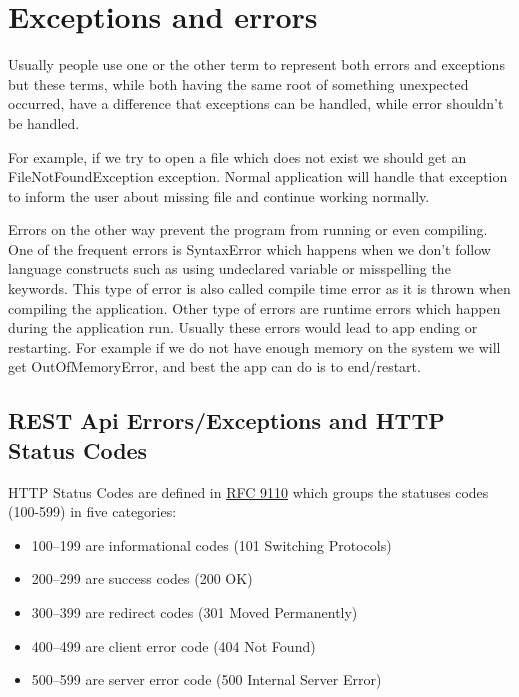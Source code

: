     \section{Exceptions and errors}\label{sec:exceptions-and-errors}

    Usually people use one or the other term to represent both errors and exceptions
    but these terms, while both having the same root of something unexpected occurred,
    have a difference that exceptions can be handled, while error shouldn't be handled.

    For example, if we try to open a file which does not exist we should get an
    FileNotFoundException exception.
    Normal application will handle that exception to
    inform the user about missing file and continue working normally.

    Errors on the other way prevent the program from running or even compiling.
    One of the frequent errors is SyntaxError which happens when we don't follow
    language constructs such as using undeclared variable or misspelling the keywords.
    This type of error is also called compile time error as it is thrown
    when compiling the application.
    Other type of errors are runtime errors
    which happen during the application run.
    Usually these errors would lead to
    app ending or restarting.
    For example if we do not have enough memory on
    the system we will get OutOfMemoryError, and best the app can do is to end/restart.

    \subsection{REST Api Errors/Exceptions and HTTP Status Codes}
    \label{subsec:rest-api-errors/exceptions-and-http-status-codes}

    HTTP Status Codes are defined in \href{https://httpwg.org/specs/rfc9110.html#overview.of.status.codes}{RFC 9110}
    which groups the statuses codes (100-599) in five categories:
    \begin{itemize}
        \item 100--199 are informational codes (101 Switching Protocols)
        \item 200--299 are success codes (200 OK)
        \item 300--399 are redirect codes (301 Moved Permanently)
        \item 400--499 are client error code (404 Not Found)
        \item 500--599 are server error code (500 Internal Server Error)
    \end{itemize}

